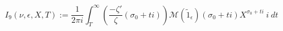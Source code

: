 \begin{definition}[I₉]
\label{I9}
\leanok
$$
  I_9(\nu, \epsilon, X, T) := \frac{1}{2\pi i} \int_{T}^{\infty}
  \left(
  \frac{-\zeta'}\zeta(\sigma_0 + t i)
  \right)
    \mathcal M(\widetilde 1_\epsilon)(\sigma_0 + t i)
  X^{\sigma_0 + t i} \ i \ dt
  $$
\end{definition}
